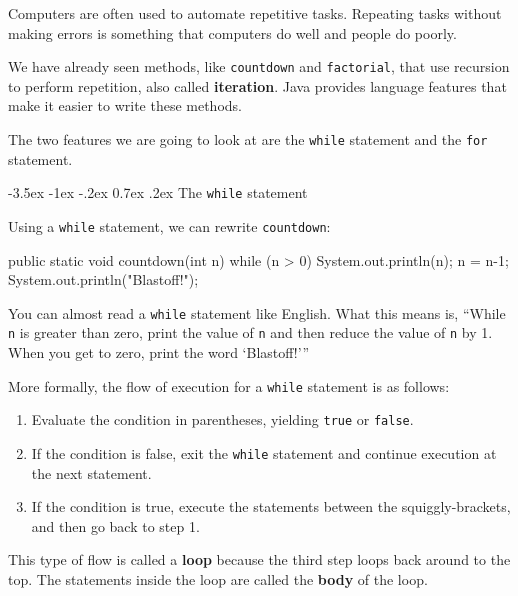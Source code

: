 \documentclass{book}
\makeatletter
\renewcommand{\section}{\@startsection 
    {section} {1} {0mm}%
    {-3.5ex \@plus -1ex \@minus -.2ex}%
    {0.7ex \@plus.2ex}%
    {\normalfont\Large\bfseries}}
\makeatother
\begin{document}
Computers are often used to automate repetitive tasks.  Repeating
tasks without making errors is something that
computers do well and people do poorly.

We have already seen methods, like {\tt countdown} and {\tt factorial},
 that use recursion to perform repetition, also called
{\bf iteration}.  Java provides language features that make
it easier to write these methods.

The two features we are going to look at are the {\tt while}
statement and the {\tt for} statement.

\section{The {\tt while} statement}

Using a {\tt while} statement, we can rewrite {\tt countdown}:

\begin{verbatimtab}
  public static void countdown(int n) {
    while (n > 0) {
      System.out.println(n);
      n = n-1;
    }
    System.out.println("Blastoff!");
  }
\end{verbatimtab}
%
You can almost read a {\tt while} statement like
English.  What this means is, ``While {\tt n} is greater than
zero, print the value of {\tt n} and then reduce
the value of {\tt n} by 1.  When you get to zero, print the
word `Blastoff!'''

More formally, the flow of execution for a {\tt while} statement
is as follows:

\begin{enumerate}

\item Evaluate the condition in parentheses, yielding {\tt true}
or {\tt false}.

\item If the condition is false, exit the {\tt while} statement
and continue execution at the next statement.

\item If the condition is true, execute the statements
between the squiggly-brackets, and then go back to step 1.

\end{enumerate}

This type of flow is called a {\bf loop} because the third step loops
back around to the top.  The statements inside the loop are called
the {\bf body} of the loop.
\end{document}
